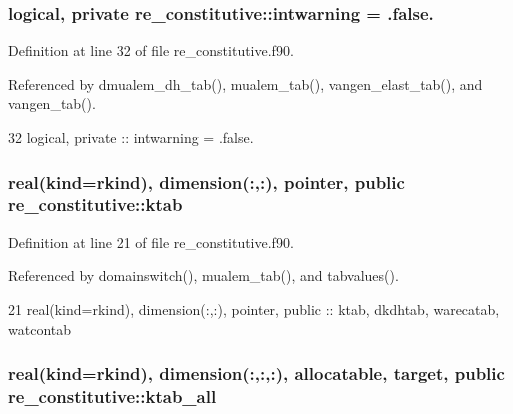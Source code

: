 \subsubsection[{intwarning}]{\setlength{\rightskip}{0pt plus 5cm}logical, private re\+\_\+constitutive\+::intwarning = .false.\hspace{0.3cm}{\ttfamily [private]}}\label{namespacere__constitutive_aa375bb88f1a33731026e0fd7b7c195c6}


Definition at line 32 of file re\+\_\+constitutive.\+f90.



Referenced by dmualem\+\_\+dh\+\_\+tab(), mualem\+\_\+tab(), vangen\+\_\+elast\+\_\+tab(), and vangen\+\_\+tab().


\begin{DoxyCode}
32   \textcolor{keywordtype}{logical}, \textcolor{keywordtype}{private} :: intwarning = .false.
\end{DoxyCode}
\subsubsection[{ktab}]{\setlength{\rightskip}{0pt plus 5cm}real(kind=rkind), dimension(\+:,\+:), pointer, public re\+\_\+constitutive\+::ktab}\label{namespacere__constitutive_a26f9eee4bd880098c0ac3bf055da68db}


Definition at line 21 of file re\+\_\+constitutive.\+f90.



Referenced by domainswitch(), mualem\+\_\+tab(), and tabvalues().


\begin{DoxyCode}
21   \textcolor{keywordtype}{real(kind=rkind)}, \textcolor{keywordtype}{dimension(:,:)}, \textcolor{keywordtype}{pointer}, \textcolor{keywordtype}{public} :: ktab, dkdhtab, warecatab, 
      watcontab
\end{DoxyCode}
\subsubsection[{ktab\+\_\+all}]{\setlength{\rightskip}{0pt plus 5cm}real(kind=rkind), dimension(\+:,\+:,\+:), allocatable, target, public re\+\_\+constitutive\+::ktab\+\_\+all}\label{namespacere__constitutive_afe17d121c5500a37fef85872e51138ff}


